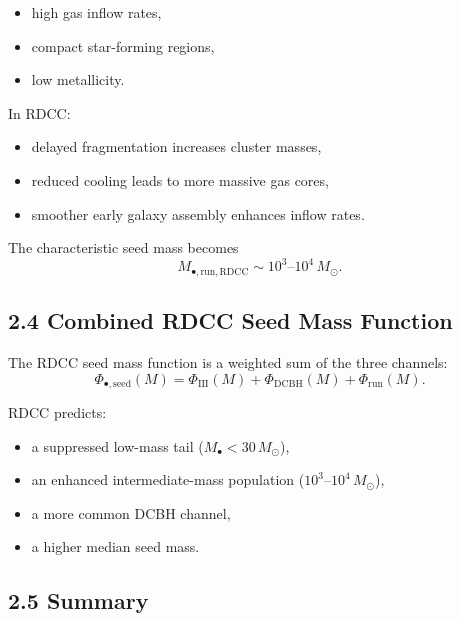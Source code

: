 \documentclass[11pt,a4paper]{article}
\begin{document}
\begin{itemize}
    \item high gas inflow rates,
    \item compact star-forming regions,
    \item low metallicity.
\end{itemize}

In RDCC:

\begin{itemize}
    \item delayed fragmentation increases cluster masses,
    \item reduced cooling leads to more massive gas cores,
    \item smoother early galaxy assembly enhances inflow rates.
\end{itemize}

The characteristic seed mass becomes
\begin{equation}
    M_{\bullet,\mathrm{run,RDCC}}
    \sim 10^{3}\text{--}10^{4}\,M_{\odot}.
\end{equation}

\subsection*{2.4 Combined RDCC Seed Mass Function}

The RDCC seed mass function is a weighted sum of the three channels:
\begin{equation}
    \Phi_{\bullet,\mathrm{seed}}(M)
    = \Phi_{\mathrm{III}}(M)
    + \Phi_{\mathrm{DCBH}}(M)
    + \Phi_{\mathrm{run}}(M).
\end{equation}

RDCC predicts:

\begin{itemize}
    \item a suppressed low-mass tail ($M_{\bullet} < 30\,M_{\odot}$),
    \item an enhanced intermediate-mass population ($10^{3}$–$10^{4}\,M_{\odot}$),
    \item a more common DCBH channel,
    \item a higher median seed mass.
\end{itemize}

\subsection*{2.5 Summary}
\end{document}
